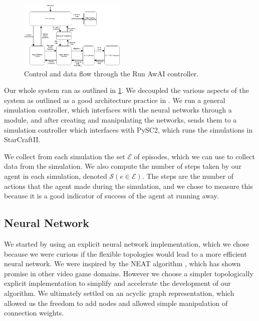 \documentclass{article}
\begin{document}
\begin{figure}[h]\label{fig:flow chart}
\centering
\includegraphics[width=0.45\textwidth]{chart}
\begin{changemargin}{0.15in}{0.15in}
  \caption{Control and data flow through the Run AwAI controller.}
\end{changemargin}
\end{figure}

Our whole system ran as outlined in \ref{fig:flow chart}. We decoupled the
various aspects of the system as outlined as a good architecture practice in
\cite{pragprog}. We run a general simulation controller, which interfaces with
the neural networks through a module, and after creating and manipulating the
networks, sends them to a simulation controller which interfaces with PySC2,
which runs the simulations in StarCraftII.

We collect from each simulation the set $\bm{\mathcal{E}}$ of episodes, which we
can use to collect data from the simulation. We also compute the number of steps
taken by our agent in each simulation, denoted
$\mathcal{S}(e\in\bm{\mathcal{E}})$. The steps are the number of actions that
the agent made during the simulation, and we chose to measure this because it is
a good indicator of success of the agent at running away.

\subsection{Neural Network}
We started by using an explicit neural network implementation, which we chose
because we were curious if the flexible topologies would lead to a more
efficient neural network. We were inspired by the NEAT algorithm \cite{NEAT},
which has shown promise in other video game domains. However we choose a simpler
topologically explicit implementation to simplify and accelerate the development
of our algorithm. We ultimately settled on an acyclic graph representation,
which allowed us the freedom to add nodes and allowed simple manipulation of
connection weights.
\end{document}
